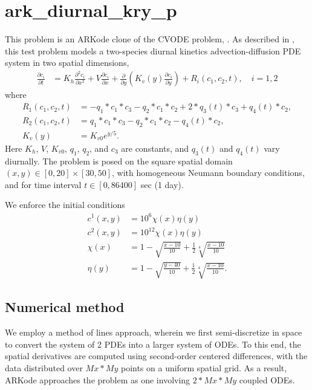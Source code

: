 \documentclass[letterpaper,10pt,english]{sphinxmanual}
\begin{document}
\section{ark\_diurnal\_kry\_p}
\label{\detokenize{c_parallel:id3}}\label{\detokenize{c_parallel:ark-diurnal-kry-p}}
This problem is an ARKode clone of the CVODE problem,
.  As described in \label{\detokenize{c_parallel:id4}}{\hyperref[\detokenize{References:hsr2017}]{\sphinxcrossref{{[}HSR2017{]}}}}, this test problem
models a two-species diurnal kinetics advection-diffusion PDE system
in two spatial dimensions,
\begin{equation*}
\begin{split}\frac{\partial c_i}{\partial t} &=
  K_h \frac{\partial^2 c_i}{\partial x^2} +
  V \frac{\partial     c_i}{\partial x} +
  \frac{\partial}{\partial y}\left( K_v(y)
  \frac{\partial c_i}{\partial y}\right) +
  R_i(c_1,c_2,t),\quad i=1,2\end{split}
\end{equation*}
where
\begin{equation*}
\begin{split}R_1(c_1,c_2,t) &= -q_1*c_1*c_3 - q_2*c_1*c_2 + 2*q_3(t)*c_3 + q_4(t)*c_2, \\
R_2(c_1,c_2,t) &=  q_1*c_1*c_3 - q_2*c_1*c_2 - q_4(t)*c_2, \\
K_v(y) &= K_{v0} e^{y/5}.\end{split}
\end{equation*}
Here \(K_h\), \(V\), \(K_{v0}\), \(q_1\), \(q_2\),
and \(c_3\) are constants, and \(q_3(t)\) and \(q_4(t)\)
vary diurnally.  The problem is posed on the square spatial domain
\((x,y) \in [0,20]\times[30,50]\), with homogeneous Neumann
boundary conditions, and for time interval \(t\in [0,86400]\) sec
(1 day).

We enforce the initial conditions
\begin{equation*}
\begin{split}c^1(x,y) &=  10^6 \chi(x)\eta(y) \\
c^2(x,y) &=  10^{12} \chi(x)\eta(y) \\
\chi(x) &= 1 - \sqrt{\frac{x - 10}{10}} + \frac12 \sqrt[4]{\frac{x - 10}{10}} \\
\eta(y) &= 1 - \sqrt{\frac{y - 40}{10}} + \frac12 \sqrt[4]{\frac{x - 10}{10}}.\end{split}
\end{equation*}

\subsection{Numerical method}
\label{\detokenize{c_parallel:id5}}
We employ a method of lines approach, wherein we first semi-discretize
in space to convert the system of 2 PDEs into a larger system of ODEs.
To this end, the spatial derivatives are computed using second-order
centered differences, with the data distributed over \(Mx*My\)
points on a uniform spatial grid.  As a result, ARKode approaches the
problem as one involving \(2*Mx*My\) coupled ODEs.
\end{document}
